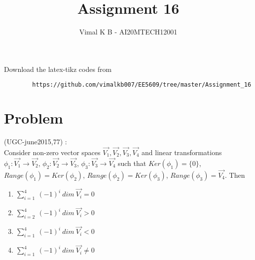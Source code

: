 \documentclass[journal,12pt]{IEEEtran}
\begin{document}
	\renewcommand{\thefigure}{\theproblem}
	\def\putbox#1#2#3{\makebox[0in][l]{\makebox[#1][l]{}\raisebox{\baselineskip}[0in][0in]{\raisebox{#2}[0in][0in]{#3}}}}
	\def\rightbox#1{\makebox[0in][r]{#1}}
	\def\centbox#1{\makebox[0in]{#1}}
	\def\topbox#1{\raisebox{-\baselineskip}[0in][0in]{#1}}
	\def\midbox#1{\raisebox{-0.5\baselineskip}[0in][0in]{#1}}
	\vspace{3cm}
	\title{Assignment 16}
	\author{Vimal K B - AI20MTECH12001}
	\maketitle
	\bigskip
	\renewcommand{\thefigure}{\theenumi}
	\renewcommand{\thetable}{\theenumi}
	Download the latex-tikz codes from 
	\begin{lstlisting}
		https://github.com/vimalkb007/EE5609/tree/master/Assignment_16
	\end{lstlisting}
	\section{\textbf{Problem}}
	(UGC-june2015,77) : \\
	Consider non-zero vector spaces $\vec{V_1}, \vec{V_2}, \vec{V_3}, \vec{V_4}$ and linear transformations $\phi_1 : \vec{V_1} \rightarrow \vec{V_2}$, $\phi_2 : \vec{V_2} \rightarrow \vec{V_3}$, $\phi_3 : \vec{V_3} \rightarrow \vec{V_4}$ such that $Ker(\phi_1) = \{0\}$, $Range(\phi_1) = Ker(\phi_2)$, $Range(\phi_2) = Ker(\phi_3)$, $Range(\phi_3) = \vec{V_4}$. Then \\
	
	\begin{enumerate}
		\item $\sum_{i=1}^{4} \ (-1)^{i} \ dim \ \vec{V_i} = 0$ \\
		\item $\sum_{i=2}^{4} \ (-1)^{i} \ dim \ \vec{V_i} > 0$ \\
		\item $\sum_{i=1}^{4} \ (-1)^{i} \ dim \ \vec{V_i} < 0$ \\
		\item $\sum_{i=1}^{4} \ (-1)^{i} \ dim \ \vec{V_i} \neq 0$
	\end{enumerate}
	
	
\end{document}

